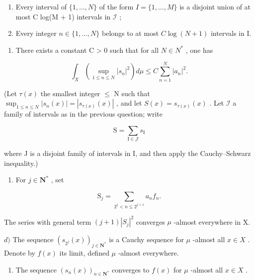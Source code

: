 \begin{enumerate}
\def\labelenumi{(\roman{enumi})}
\item
  Every interval of \(\{1, \ldots, N\}\) of the form \(I = \{1, \ldots, M\}\) is a disjoint union of at most C log(M + 1) intervals in \(\mathcal{I}\) ;
\item
  Every integer \(n \in \{1, \ldots, N\}\) belongs to at most \(C \log(N + 1)\) intervals in I.
\end{enumerate}

\begin{enumerate}
\def\labelenumi{\alph{enumi})}
\setcounter{enumi}{1}
\tightlist
\item
  There exists a constant C \textgreater{} 0 such that for all \(N \in N^{*}\) , one has
\end{enumerate}

\[
\int_ {X} \left(\sup _ {1 \leqslant n \leqslant N} | s _ {n} | ^ {2}\right) d \mu \leqslant C \sum_ {n = 1} ^ {N} | a _ {n} | ^ {2}.
\]

(Let \(\tau(x)\) the smallest integer \(\leqslant\) N such that \(\sup_{1\leqslant n\leqslant N}|s_n(x)| = |s_{\tau(x)}(x)|\) , and let \(S(x) = s_{\tau(x)}(x)\) . Let \(\mathcal{I}\) a family of intervals as in the previous question; write

\[
\mathrm{S} = \sum_ {\mathrm{I} \in \mathcal {J}} s _ {\mathrm{I}}
\]

where J is a disjoint family of intervals in I, and then apply the Cauchy–Schwarz inequality.)

\begin{enumerate}
\def\labelenumi{\alph{enumi})}
\setcounter{enumi}{2}
\tightlist
\item
  For \(j\in \mathbf{N}^*\) , set
\end{enumerate}

\[
\mathrm{S} _ {j} = \sum_ {2 ^ {j} <   n \leqslant 2 ^ {j + 1}} a _ {n} f _ {n}.
\]

The series with general term \((j+1)|S_{j}|^{2}\) converges \(\mu\) -almost everywhere in X.

\(d)\) The sequence \((s_{2^j}(x))_{j\in \mathbf{N}^*}\) is a Cauchy sequence for \(\mu\) -almost all \(x\in X\) . Denote by \(f(x)\) its limit, defined \(\mu\) -almost everywhere.

\begin{enumerate}
\def\labelenumi{\alph{enumi})}
\setcounter{enumi}{4}
\tightlist
\item
  The sequence \((s_n(x))_{n\in \mathbf{N}^*}\) converges to \(f(x)\) for \(\mu\) -almost all \(x\in X\) .
\end{enumerate}


